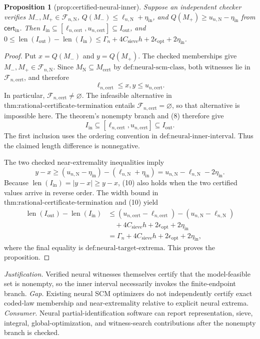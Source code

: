 \documentclass{article}
\newtheorem{proposition}{Proposition}
\begin{document}
\begin{proposition}[prop:certified-neural-inner]\label{prop:certified-neural-inner}
Suppose an independent checker verifies \(M_-,M_+\in\mathcal F_{n,\mathrm N}\), \(Q(M_-)\le\ell_{n,\mathrm N}+\eta_{\mathrm{in}}\), and \(Q(M_+)\ge u_{n,\mathrm N}-\eta_{\mathrm{in}}\) from \(\mathsf{cert}_{\mathrm{in}}\). Then \(I_{\mathrm{in}}\subseteq[\ell_{n,\mathrm{cert}},u_{n,\mathrm{cert}}]\subseteq I_{\mathrm{out}}\), and \(0\le\operatorname{len}(I_{\mathrm{out}})-\operatorname{len}(I_{\mathrm{in}})\le\Gamma_n+4C_{\mathrm{sieve}}h+2\epsilon_{\mathrm{opt}}+2\eta_{\mathrm{in}}\).
\end{proposition}
\begin{proof}
Put \(x=Q(M_-)\) and \(y=Q(M_+)\).  The checked memberships give \(M_-,M_+\in\mathcal F_{n,\mathrm N}\).  Since \(M_{\mathrm N}\subseteq M_{\mathrm{cert}}\) by \(\text{def:neural-scm-class}\), both witnesses lie in \(\mathcal F_{n,\mathrm{cert}}\), and therefore
\[
\ell_{n,\mathrm{cert}}\leq x,y\leq u_{n,\mathrm{cert}}. \tag{8}
\]
In particular, \(\mathcal F_{n,\mathrm{cert}}\ne\varnothing\).  The infeasible alternative in \(\text{thm:rational-certificate-termination}\) entails \(\mathcal F_{n,\mathrm{cert}}=\varnothing\), so that alternative is impossible here.  The theorem's nonempty branch and (8) therefore give
\[
I_{\mathrm{in}}\subseteq[\ell_{n,\mathrm{cert}},u_{n,\mathrm{cert}}]
\subseteq I_{\mathrm{out}}. \tag{9}
\]
The first inclusion uses the ordering convention in \(\text{def:neural-inner-interval}\).  Thus the claimed length difference is nonnegative.

The two checked near-extremality inequalities imply
\[
y-x\geq (u_{n,\mathrm N}-\eta_{\mathrm{in}})
-(\ell_{n,\mathrm N}+\eta_{\mathrm{in}})
=u_{n,\mathrm N}-\ell_{n,\mathrm N}-2\eta_{\mathrm{in}}. \tag{10}
\]
Because \(\operatorname{len}(I_{\mathrm{in}})=|y-x|\geq y-x\), (10) also holds when the two certified values arrive in reverse order.  The width bound in \(\text{thm:rational-certificate-termination}\) and (10) yield
\[
\begin{aligned}
\operatorname{len}(I_{\mathrm{out}})-\operatorname{len}(I_{\mathrm{in}})
&\leq (u_{n,\mathrm{cert}}-\ell_{n,\mathrm{cert}})
-(u_{n,\mathrm N}-\ell_{n,\mathrm N})\\
&\quad+4C_{\mathrm{sieve}}h+2\epsilon_{\mathrm{opt}}+2\eta_{\mathrm{in}}\\
&=\Gamma_n+4C_{\mathrm{sieve}}h+2\epsilon_{\mathrm{opt}}+2\eta_{\mathrm{in}},
\end{aligned}
\]
where the final equality is \(\text{def:neural-target-extrema}\).  This proves the proposition.
\end{proof}
\par\smallskip\noindent \textit{Justification.} Verified neural witnesses themselves certify that the model-feasible set is nonempty, so the inner interval necessarily invokes the finite-endpoint branch. \textit{Gap.} Existing neural SCM optimizers do not independently certify exact coded-law membership and near-extremality relative to explicit neural extrema. \textit{Consumer.} Neural partial-identification software can report representation, sieve, integral, global-optimization, and witness-search contributions after the nonempty branch is checked.
\end{document}
